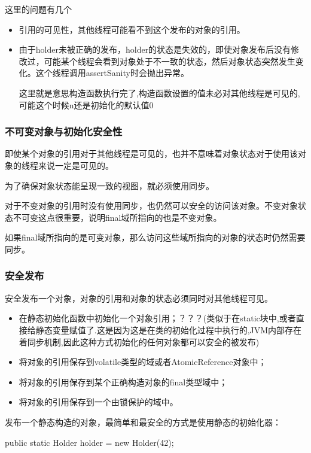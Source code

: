 这里的问题有几个
\begin{itemize}
\item 引用的可见性，其他线程可能看不到这个发布的对象的引用。
\item 由于holder未被正确的发布，holder的状态是失效的，即使对象发布后没有修改过，可能某个线程会看到对象处于不一致的状态，然后对象状态突然发生变化。这个线程调用assertSanity时会抛出异常。

这里就是意思构造函数执行完了,构造函数设置的值未必对其他线程是可见的,可能这个时候n还是初始化的默认值0

\end{itemize}

\subsubsection{不可变对象与初始化安全性}

即使某个对象的引用对于其他线程是可见的，也并不意味着对象状态对于使用该对象的线程来说一定是可见的。

为了确保对象状态能呈现一致的视图，就必须使用同步。

对于不变对象的引用时没有使用同步，也仍然可以安全的访问该对象。不变对象状态不可变这点很重要，说明final域所指向的也是不变对象。

如果final域所指向的是可变对象，那么访问这些域所指向的对象的状态时仍然需要同步。

\subsubsection{安全发布}

安全发布一个对象，对象的引用和对象的状态必须同时对其他线程可见。
\begin{itemize}
\item 在静态初始化函数中初始化一个对象引用；？？？(类似于在static块中,或者直接给静态变量赋值了.这是因为这是在类的初始化过程中执行的,JVM内部存在着同步机制,因此这种方式初始化的任何对象都可以安全的被发布)
\item 将对象的引用保存到volatile类型的域或者AtomicReference对象中；
\item 将对象的引用保存到某个正确构造对象的final类型域中；
\item 将对象的引用保存到一个由锁保护的域中。
\end{itemize}

发布一个静态构造的对象，最简单和最安全的方式是使用静态的初始化器：
\begin{Java}
public static Holder holder = new Holder(42);
\end{Java}

